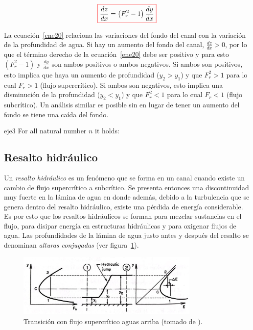 \documentclass[11pt, oneside]{article}
\begin{document}
\begin{equation}
\color{red}\boxed{\color{black} \frac{dz}{dx} = \left( F_r^2 - 1 \right)\frac{dy}{dx} }
\label{ene20}
\end{equation}

La ecuaci\'on~\ref{ene20} relaciona las variaciones del fondo del canal con la variaci\'on de la profundidad de agua. Si hay un aumento del fondo del canal, $\frac{dz}{dx} > 0$, por lo que el t\'ermino derecho de la ecuaci\'on~\ref{ene20} debe ser positivo y para esto $\left( F_r^2 - 1 \right)$ y  $\frac{dy}{dx}$ son ambos positivos o ambos negativos. Si ambos son positivos, esto implica que haya un aumento de profundidad ($y_2 > y_1$) y que $F_r^2 > 1$ para lo cual $F_r > 1$ (flujo supercr\'itico). Si ambos son negativos, esto implica una disminuci\'on de la profundidad ($y_2 < y_1$) y que $F_r^2 < 1$ para lo cual $F_r < 1$ (flujo subcr\'itico). Un an\'alisis similar es posible sin en lugar de tener un aumento del fondo se tiene una ca\'ida del fondo. 
 
\begin{eje}{}{eje3}
  For all natural number $n$ it holds:
\end{eje}


\subsection{Resalto hidr\'aulico}
Un \emph{resalto hidr\'aulico} es un fen\'omeno que se forma en un canal cuando existe un cambio de flujo supercr\'itico a subcr\'itico. Se presenta entonces una discontinuidad muy fuerte en la l\'amina de agua en donde adem\'as, debido a la turbulencia que se genera dentro del resalto hidr\'aulico, existe una p\'erdida de energ\'ia considerable. Es por esto que los resaltos hidr\'aulicos se forman para mezclar sustancias en el flujo, para disipar energ\'ia en estructuras hidr\'aulicas y para oxigenar flujos de agua. Las profundidades de la l\'amina de agua justo antes y despu\'es del resalto se denominan \emph{alturas conjugadas} (ver figura~\ref{fig14}). 

\begin{figure}[h]
\centering
\includegraphics[width=0.8\textwidth]{fig211.jpeg}
\caption{Transici\'on con flujo supercr\'itico aguas arriba (tomado de \cite{Chau}).}
\label{fig14}
\end{figure}
\end{document}
